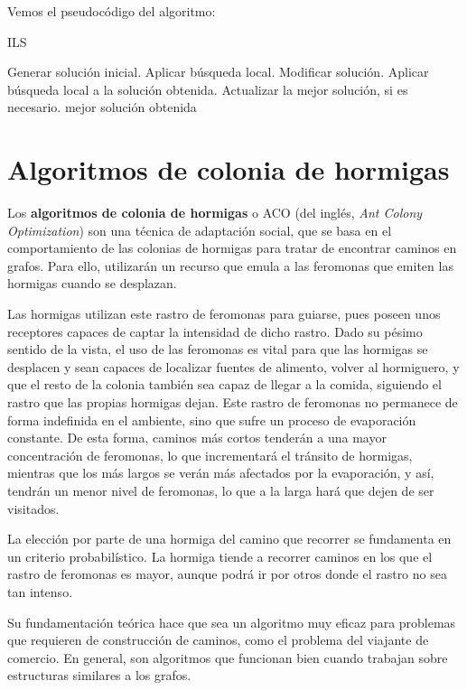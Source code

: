 Vemos el pseudocódigo del algoritmo:

\begin{algorithm}[H]
\caption{ILS}
  \begin{algorithmic}
    \State Generar solución inicial.
    \State Aplicar búsqueda local.
    \Repeat
      \State Modificar solución.
      \State Aplicar búsqueda local a la solución obtenida.
      \State Actualizar la mejor solución, si es necesario.
    \Return mejor solución obtenida
  \EndFunction
  \end{algorithmic}
\end{algorithm}

\section{Algoritmos de colonia de hormigas}\label{aco}

Los \textbf{algoritmos de colonia de hormigas} \citep{dorigo:1996} o ACO
(del inglés, \textit{Ant Colony Optimization}) son una técnica de adaptación social,
que se basa en el comportamiento de las colonias de hormigas para tratar de encontrar
caminos en grafos. Para ello, utilizarán un recurso que emula a las feromonas que
emiten las hormigas cuando se desplazan.

Las hormigas utilizan este rastro de feromonas para guiarse, pues poseen unos receptores
capaces de captar la intensidad de dicho rastro. Dado su pésimo sentido de la vista,
el uso de las feromonas es vital para que las hormigas se desplacen y sean capaces de
localizar fuentes de alimento, volver al hormiguero, y que el resto de la colonia también
sea capaz de llegar a la comida, siguiendo el rastro que las propias hormigas dejan.
Este rastro de feromonas no permanece de forma indefinida en el ambiente, sino que
sufre un proceso de evaporación constante. De esta forma, caminos más cortos tenderán
a una mayor concentración de feromonas, lo que incrementará el tránsito de hormigas,
mientras que los más largos se verán más afectados por la evaporación, y así,
tendrán un menor nivel de feromonas, lo que a la larga hará que dejen de ser visitados.

La elección por parte de una hormiga del camino que recorrer se fundamenta en un
criterio probabilístico. La hormiga tiende a recorrer caminos en los que el rastro
de feromonas es mayor, aunque podrá ir por otros donde el rastro no sea tan intenso.

Su fundamentación teórica hace que sea un algoritmo muy eficaz para problemas que
requieren de construcción de caminos, como el problema del viajante de comercio.
En general, son algoritmos que funcionan bien cuando trabajan sobre estructuras
similares a los grafos.

